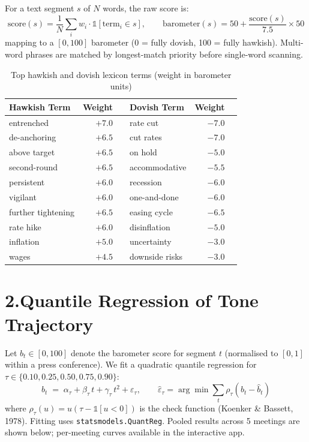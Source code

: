 \documentclass[11pt,a4paper]{article}
\begin{document}
For a text segment $s$ of $N$ words, the raw score is:
\begin{equation}
    \text{score}(s) = \frac{1}{N}\sum_{i} w_i \cdot \mathbb{1}[\text{term}_i \in s],
    \qquad \text{barometer}(s) = 50 + \frac{\text{score}(s)}{7.5} \times 50
\end{equation}
mapping to a $[0, 100]$ barometer (0 = fully dovish, 100 = fully hawkish). Multi-word
phrases are matched by longest-match priority before single-word scanning.

\vspace{0.2cm}
\begin{table}[H]
\centering
\caption{Top hawkish and dovish lexicon terms (weight in barometer units)}
\small
\begin{tabularx}{\textwidth}{lrX|lrX}
\toprule
\rowcolor{lightgrey}
\textbf{Hawkish Term} & \textbf{Weight} & & \textbf{Dovish Term} & \textbf{Weight} & \\
\midrule
entrenched             & $+7.0$ & & rate cut              & $-7.0$ & \\
de-anchoring           & $+6.5$ & & cut rates             & $-7.0$ & \\
above target           & $+6.5$ & & on hold               & $-5.0$ & \\
second-round           & $+6.5$ & & accommodative         & $-5.5$ & \\
persistent             & $+6.0$ & & recession             & $-6.0$ & \\
vigilant               & $+6.0$ & & one-and-done          & $-6.0$ & \\
further tightening     & $+6.5$ & & easing cycle          & $-6.5$ & \\
rate hike              & $+6.0$ & & disinflation          & $-5.0$ & \\
inflation              & $+5.0$ & & uncertainty           & $-3.0$ & \\
wages                  & $+4.5$ & & downside risks        & $-3.0$ & \\
\bottomrule
\end{tabularx}
\end{table}

\section*{2.\quad Quantile Regression of Tone Trajectory}

Let $b_t \in [0,100]$ denote the barometer score for segment $t$ (normalised to $[0,1]$
within a press conference). We fit a quadratic quantile regression for $\tau \in \{0.10, 0.25, 0.50, 0.75, 0.90\}$:
\begin{equation}
    b_t \;=\; \alpha_\tau + \beta_\tau\, t + \gamma_\tau\, t^2 + \varepsilon_\tau,
    \qquad \hat\varepsilon_\tau = \arg\min \sum_t \rho_\tau(b_t - \hat{b}_t)
\end{equation}
where $\rho_\tau(u) = u(\tau - \mathbb{1}[u<0])$ is the check function (Koenker \& Bassett, 1978).
Fitting uses \texttt{statsmodels.QuantReg}. Pooled results across 5 meetings are shown below;
per-meeting curves available in the interactive app.
\end{document}
